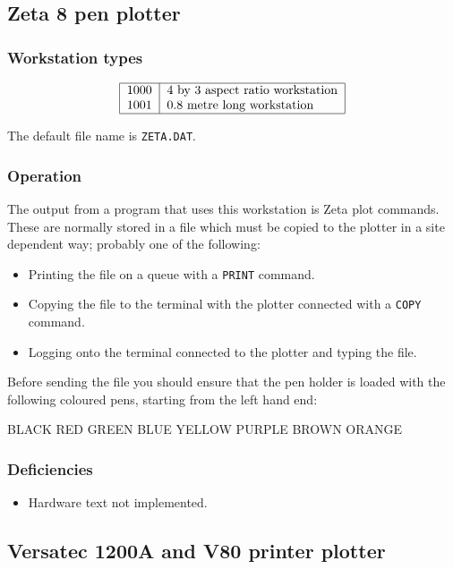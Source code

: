 \subsection{Zeta 8 pen plotter}
\label{zeta}
\subsubsection{Workstation types}
\[\begin{tabular}{|l|l|}\hline
1000 &4 by 3 aspect ratio workstation\\ 
1001 &0.8 metre long workstation\\\hline
\end{tabular}\]

The default file name is {\tt ZETA.DAT}.

\subsubsection{Operation}
The output from a program that uses this workstation is Zeta plot commands.
These are normally stored in a file which must be copied to the plotter in
a site dependent way; probably one of the following:
\begin{itemize}
\item Printing the file on a queue with a {\tt PRINT} command.
\item Copying the file to the terminal with the plotter connected with a
{\tt COPY} command.
\item Logging onto the terminal connected to the plotter and typing the file.
\end{itemize}
Before sending the file you should ensure that the pen holder is loaded with
the following coloured pens, starting from the left hand end:

\begin{center}
BLACK RED GREEN BLUE YELLOW PURPLE BROWN ORANGE
\end{center}
           
\subsubsection{Deficiencies}
\begin{itemize}
\item Hardware text not implemented.
\end{itemize}

\subsection{Versatec 1200A and V80 printer plotter}
\label{vers}
